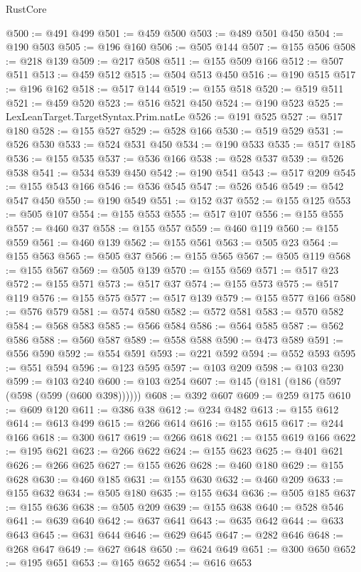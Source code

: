 \begin{lexlean}{RustCore}
\begin{coremodule}
@500 := @491 @499
@501 := @459 @500
@503 := @489 @501 @450
@504 := @190 @503
@505 := @196 @160
@506 := @505 @144
@507 := @155 @506
@508 := @218 @139
@509 := @217 @508
@511 := @155 @509 @166
@512 := @507 @511
@513 := @459 @512
@515 := @504 @513 @450
@516 := @190 @515
@517 := @196 @162
@518 := @517 @144
@519 := @155 @518
@520 := @519 @511
@521 := @459 @520
@523 := @516 @521 @450
@524 := @190 @523
@525 := LexLeanTarget.TargetSyntax.Prim.natLe
@526 := @191 @525
@527 := @517 @180
@528 := @155 @527
@529 := @528 @166
@530 := @519 @529
@531 := @526 @530
@533 := @524 @531 @450
@534 := @190 @533
@535 := @517 @185
@536 := @155 @535
@537 := @536 @166
@538 := @528 @537
@539 := @526 @538
@541 := @534 @539 @450
@542 := @190 @541
@543 := @517 @209
@545 := @155 @543 @166
@546 := @536 @545
@547 := @526 @546
@549 := @542 @547 @450
@550 := @190 @549
@551 := @152 @37
@552 := @155 @125
@553 := @505 @107
@554 := @155 @553
@555 := @517 @107
@556 := @155 @555
@557 := @460 @37
@558 := @155 @557
@559 := @460 @119
@560 := @155 @559
@561 := @460 @139
@562 := @155 @561
@563 := @505 @23
@564 := @155 @563
@565 := @505 @37
@566 := @155 @565
@567 := @505 @119
@568 := @155 @567
@569 := @505 @139
@570 := @155 @569
@571 := @517 @23
@572 := @155 @571
@573 := @517 @37
@574 := @155 @573
@575 := @517 @119
@576 := @155 @575
@577 := @517 @139
@579 := @155 @577 @166
@580 := @576 @579
@581 := @574 @580
@582 := @572 @581
@583 := @570 @582
@584 := @568 @583
@585 := @566 @584
@586 := @564 @585
@587 := @562 @586
@588 := @560 @587
@589 := @558 @588
@590 := @473 @589
@591 := @556 @590
@592 := @554 @591
@593 := @221 @592
@594 := @552 @593
@595 := @551 @594
@596 := @123 @595
@597 := @103 @209
@598 := @103 @230
@599 := @103 @240
@600 := @103 @254
@607 := @145 (@181 (@186 (@597 (@598 (@599 (@600 @398))))))
@608 := @392 @607
@609 := @259 @175
@610 := @609 @120
@611 := @386 @38
@612 := @234 @482
@613 := @155 @612
@614 := @613 @499
@615 := @266 @614
@616 := @155 @615
@617 := @244 @166
@618 := @300 @617
@619 := @266 @618
@621 := @155 @619 @166
@622 := @195 @621
@623 := @266 @622
@624 := @155 @623
@625 := @401 @621
@626 := @266 @625
@627 := @155 @626
@628 := @460 @180
@629 := @155 @628
@630 := @460 @185
@631 := @155 @630
@632 := @460 @209
@633 := @155 @632
@634 := @505 @180
@635 := @155 @634
@636 := @505 @185
@637 := @155 @636
@638 := @505 @209
@639 := @155 @638
@640 := @528 @546
@641 := @639 @640
@642 := @637 @641
@643 := @635 @642
@644 := @633 @643
@645 := @631 @644
@646 := @629 @645
@647 := @282 @646
@648 := @268 @647
@649 := @627 @648
@650 := @624 @649
@651 := @300 @650
@652 := @195 @651
@653 := @165 @652
@654 := @616 @653

\end{coremodule}
\end{lexlean}
